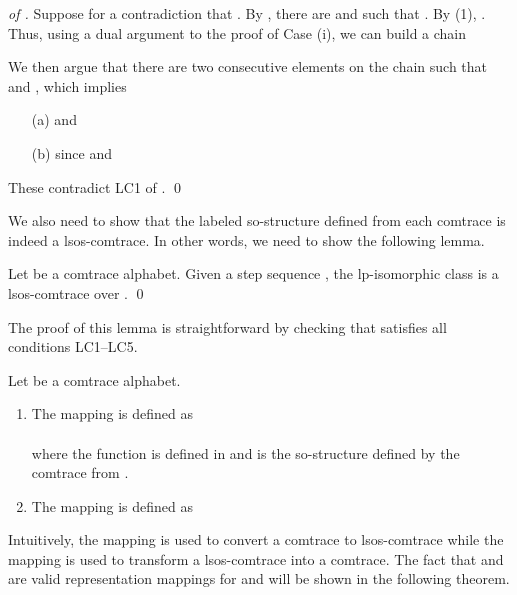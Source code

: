 \documentclass{llncs}
\begin{document}
\begin{proof}[of ]
Suppose for a contradiction that . By , there are   and  such that . By   (1), . Thus, using a dual argument to the proof of Case (i), we can build a chain

We then argue that there are two consecutive elements on the chain such that  and , which implies 
\begin{enumerate}
 \item[(a)]  and 
 \item[(b)]  since  and 
\end{enumerate}
These contradict  \textsf{LC1} of . \qed

\end{proof}


We also need to show that the labeled so-structure defined from each comtrace is indeed a lsos-comtrace. In other words, we need to show the following lemma.

\begin{lemma}  Let  be a comtrace alphabet. Given a step sequence  , the lp-isomorphic class  is a lsos-comtrace over . \qed
\label{lem:l3}
\end{lemma}

The proof of this lemma is straightforward by checking that  satisfies all conditions \textsf{LC1}--\textsf{LC5}.


\begin{definition} Let  be a comtrace alphabet. 
\begin{enumerate}
 \item The mapping   is defined as\smallskip\\
 \mbox{\hspace{4cm}}\smallskip\\
where the function  is defined in  and  is the so-structure defined by the comtrace  from . 
 \item The mapping   is defined as\smallskip\\
\mbox{\hspace{1.5cm}} 
 \EOD
\end{enumerate}
\label{def:repmaps}
\end{definition}

Intuitively, the mapping  is used to convert a comtrace to lsos-comtrace while the mapping  is used to transform a lsos-comtrace into a comtrace. The fact that  and  are valid representation mappings for  and   will be  shown in the following theorem. 
\end{document}

